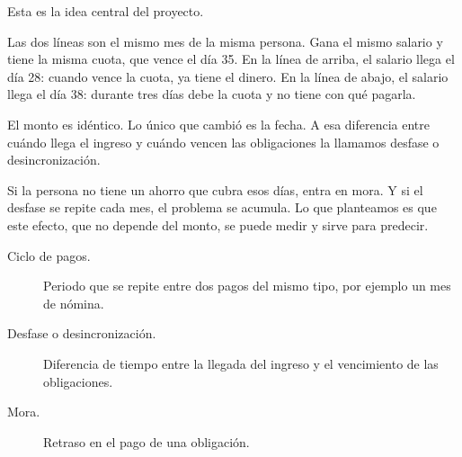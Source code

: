 \begin{decir}
Esta es la idea central del proyecto.

Las dos líneas son el mismo mes de la misma persona. Gana el mismo salario y tiene la
misma cuota, que vence el día 35. En la línea de arriba, el salario llega el
día 28: cuando vence la cuota, ya tiene el dinero. En la línea de abajo, el salario llega
el día 38: durante tres días debe la cuota y no tiene con qué pagarla.

El monto es idéntico. Lo único que cambió es la fecha. A esa diferencia entre cuándo
llega el ingreso y cuándo vencen las obligaciones la llamamos desfase o
desincronización.

Si la persona no tiene un ahorro que cubra esos días, entra en mora. Y si el desfase se
repite cada mes, el problema se acumula. Lo que planteamos es que este efecto, que no
depende del monto, se puede medir y sirve para predecir.
\end{decir}
\begin{terminos}
\begin{description}
\item[Ciclo de pagos.] Periodo que se repite entre dos pagos del mismo tipo, por
ejemplo un mes de nómina.
\item[Desfase o desincronización.] Diferencia de tiempo entre la llegada del ingreso y
el vencimiento de las obligaciones.
\item[Mora.] Retraso en el pago de una obligación.
\end{description}
\end{terminos}

